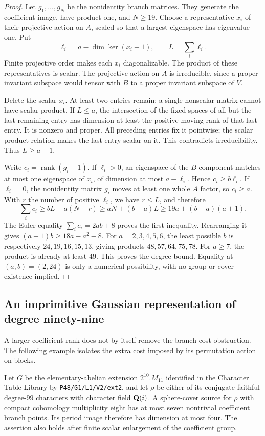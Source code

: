 \begin{proof}
Let $g_1,\ldots,g_N$ be the nonidentity branch matrices.  They generate
the coefficient image, have product one, and $N\ge19$.
Choose a representative $x_i$ of their projective action on $A$,
scaled so that a largest eigenspace has eigenvalue one.  Put
\[
 \ell_i=a-\dim\ker(x_i-1),\qquad L=\sum_i\ell_i.
\]
Finite projective order makes each $x_i$ diagonalizable.  The product
of these representatives is scalar.  The projective action on $A$
is irreducible, since a proper invariant subspace would tensor with
$B$ to a proper invariant subspace of $V$.

Delete the scalar $x_i$.  At least two entries remain: a single
nonscalar matrix cannot have scalar product.  If $L\le a$, the
intersection of the fixed spaces of all but the last remaining
entry has dimension at least the positive moving rank of that last
entry.  It is nonzero and proper.  All preceding entries fix it
pointwise; the scalar product relation makes the last entry scalar
on it.  This contradicts irreducibility.  Thus $L\ge a+1$.

Write $c_i=\operatorname{rank}(g_i-1)$.  If $\ell_i>0$, an eigenspace
of the $B$ component matches at most one eigenspace of $x_i$, of
dimension at most $a-\ell_i$.  Hence $c_i\ge b\ell_i$.
If $\ell_i=0$, the nonidentity matrix $g_i$ moves at least one whole
$A$ factor, so $c_i\ge a$.  With $r$ the number of positive $\ell_i$,
we have $r\le L$, and therefore
\[
 \sum_i c_i\ge bL+a(N-r)
    \ge aN+(b-a)L
    \ge19a+(b-a)(a+1).
\]
The Euler equality $\sum_i c_i=2ab+8$ proves the first inequality.
Rearranging it gives $(a-1)b\ge18a-a^2-8$.
For $a=2,3,4,5,6$, the least possible $b$ is respectively
$24,19,16,15,13$, giving products $48,57,64,75,78$.
For $a\ge7$, the product is already at least $49$.
This proves the degree bound.  Equality at $(a,b)=(2,24)$ is only
a numerical possibility, with no group or cover existence implied.
\end{proof}

\subsection{An imprimitive Gaussian representation of degree ninety-nine}

A larger coefficient rank does not by itself remove the branch-cost
obstruction. The following example isolates the extra cost imposed by
its permutation action on blocks.

\begin{proposition}\label{prop:degree99-cover}
Let $G$ be the elementary-abelian extension $2^{10}.M_{11}$ identified
in the Character Table Library by
\texttt{P48/G1/L1/V2/ext2}, and let $\rho$ be either of its conjugate
faithful degree-$99$ characters with character field $\mathbf Q(i)$.
A sphere-cover source for $\rho$ with compact cohomology multiplicity
eight has at most seven nontrivial coefficient branch points. Its
period image therefore has dimension at most four. The assertion
also holds after finite scalar enlargement of the coefficient group.
\end{proposition}

